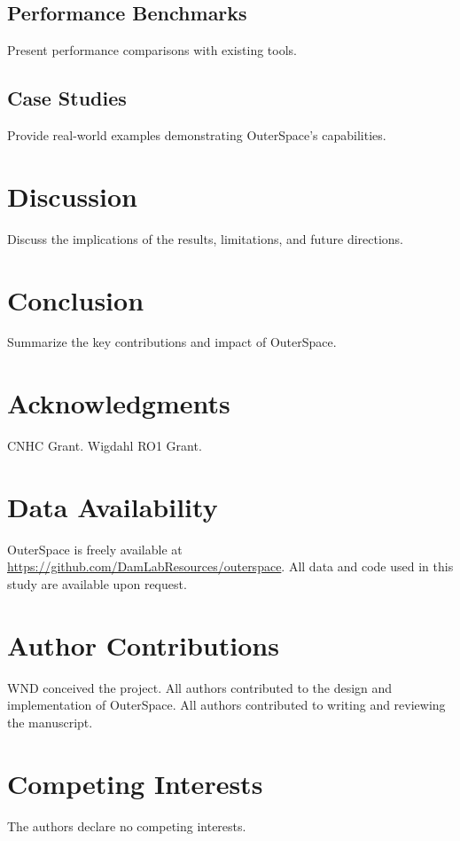\documentclass[9pt,twocolumn,twoside]{extarticle}
\begin{document}
\subsection{Performance Benchmarks}

Present performance comparisons with existing tools.

\subsection{Case Studies}

Provide real-world examples demonstrating OuterSpace's capabilities.

\section{Discussion}

Discuss the implications of the results, limitations, and future directions.

\section{Conclusion}

Summarize the key contributions and impact of OuterSpace.

\section*{Acknowledgments}

CNHC Grant.
Wigdahl RO1 Grant.

\section*{Data Availability}

OuterSpace is freely available at \url{https://github.com/DamLabResources/outerspace}.
All data and code used in this study are available upon request.

\section*{Author Contributions}

WND conceived the project.
All authors contributed to the design and implementation of OuterSpace.
All authors contributed to writing and reviewing the manuscript.

\section*{Competing Interests}

The authors declare no competing interests.



\end{document}

